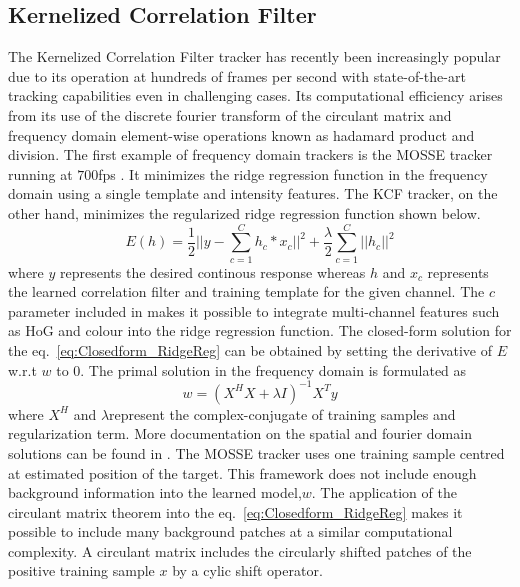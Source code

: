 \documentclass{bmvc2k}
\begin{document}
\subsection{Kernelized Correlation Filter} \label{sec:kcf}
The Kernelized Correlation Filter tracker has recently been
increasingly popular due to its operation at hundreds of frames per
second with state-of-the-art tracking capabilities even in challenging
cases. Its computational efficiency arises from its use of the discrete fourier transform of the circulant matrix and frequency domain element-wise operations known as hadamard product and
division. The first example of frequency domain trackers is the MOSSE tracker running at $700$fps \cite{bolme2010visual}. It minimizes the ridge regression function in the frequency domain using a single
template and intensity features. The KCF tracker, on the other hand, minimizes the regularized ridge regression function shown below.
\begin{equation}
E(h) = \frac{1}{2}||y-\sum_{c=1}^{C}h_{c}*x_{c}||^{2} + \frac{\lambda}{2}\sum_{c=1}^{C}||h_{c}||^{2}
\label{eq:Closedform_RidgeReg}
\end{equation}
where $y$ represents the desired continous response whereas $h$ and
$x_{c}$ represents the learned correlation filter and training
template for the given channel. The $c$ parameter included in
\cite{henriques2015high,galoogahi2013multi} makes it possible to
integrate multi-channel features such as HoG and colour into the ridge
regression function. The closed-form solution for the
eq.~\ref{eq:Closedform_RidgeReg} can be obtained by setting the
derivative of $E$ w.r.t $w$ to $0$. The primal solution in the frequency domain is formulated
as
\begin{equation}
w = (X^{H}X+\lambda I)^{-1}X^{T}y
\label{eq:FourierSolution}
\end{equation}
where $X^{H}$ and $\lambda$represent the complex-conjugate of training samples and
regularization term. More documentation on the spatial and fourier domain solutions can be
found in \cite{henriques2015high}. The MOSSE tracker uses one training sample centred at estimated position of the target. This framework does not include enough background
information into the learned model,$w$. The
application of the circulant matrix theorem into the
eq.~\ref{eq:Closedform_RidgeReg} makes it possible to include many
background patches at a similar computational complexity. A circulant
matrix includes the circularly shifted patches of the positive
training sample $x$ by a cylic shift operator. 
\end{document}
